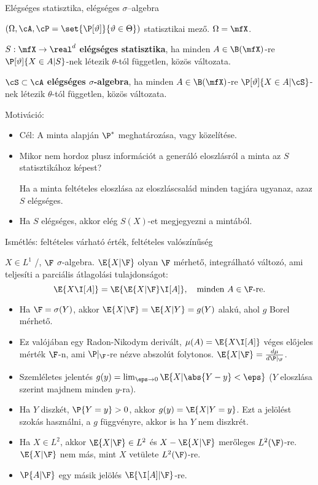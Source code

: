 \documentclass[aspectratio=169,notheorems,9pt,\option]{beamer}
\begin{document}
\begin{frame}{Elégséges statisztika, elégséges $\sigma$--algebra}

  $(\Omega,\cA,\cP=\set{\P[\theta]}{\theta\in\Theta})$ statisztikai mező. $\Omega=\mfX$.  
  \begin{df} 
    $S:\mfX\to\real^d$ \textbf{elégséges statisztika}, ha minden $A\in\B(\mfX)$-re $\P[\theta]{X\in A|S}$-nek 
    létezik $\theta$-tól független, közös változata.

    $\cS\subset\cA$ \textbf{elégséges $\sigma$-algebra}, ha minden $A\in\B(\mfX)$-re $\P[\theta]{X\in A|\cS}$-nek 
    létezik $\theta$-tól független, közös változata.
  \end{df} 

  \continue
  Motiváció:
  \begin{itemize}
    \item Cél: A minta alapján $\P^*$ meghatározása, vagy közelítése.

    \item Mikor nem hordoz plusz információt a generáló eloszlásról 
    a minta az $S$ statisztikához képest?

    Ha a minta feltételes eloszlása az eloszláscsalád minden tagjára ugyanaz, 
    azaz $S$ elégséges.

    \item Ha $S$ elégséges, akkor elég $S(X)$-et megjegyezni a mintából.
  \end{itemize}
\end{frame}

\begin{frame}{Ismétlés: feltételes várható érték, feltételes valószínűség}
  \begin{df}
    $X\in L^1$ \vv/, $\F$ $\sigma$-algebra. $\E{X|\F}$ olyan $\F$ mérhető, integrálható változó, ami teljesíti 
    a parciális átlagolási tulajdonságot:
    \begin{displaymath}
      \E{X\I[A]}=\E{\E{X|\F}\I[A]},\quad\text{minden $A\in\F$-re}.
    \end{displaymath}
  \end{df}
  \begin{itemize}
    \item Ha $\F=\sigma(Y)$, akkor $\E{X|\F}=\E{X|Y}=g(Y)$ alakú, ahol $g$ Borel mérhető.
    \item Ez valójában egy Radon-Nikodym derivált, $\mu(A)=\E{X\I[A]}$ véges előjeles mérték $\F$-n, ami $\P|_{\F}$-re 
    nézve abszolút folytonos. $\E{X|\F}=\frac{d\mu}{d\P|_{\F}}$.
    \item Szemléletes jelentés $g(y)=\lim_{\eps\to0}\E{X|\abs{Y-y}<\eps}$ ($Y$ eloszlása szerint majdnem minden $y$-ra).
    \item Ha $Y$ diszkét, $\P{Y=y}>0$, akkor $g(y)=\E{X|Y=y}$. Ezt a jelölést szokás használni, a $g$ függvényre, akkor is ha $Y$ nem diszkrét.
    \item Ha $X\in L^2$, akkor $\E{X|\F}\in L^2$ és $X-\E{X|\F}$ merőleges $L^2(\F)$-re.
    $\E{X|\F}$ nem más, mint $X$ vetülete $L^2(\F)$-re.
    \item $\P{A|\F}$ egy másik jelölés $\E{\I[A]|\F}$-re.
  \end{itemize}
\end{frame}
\end{document}

